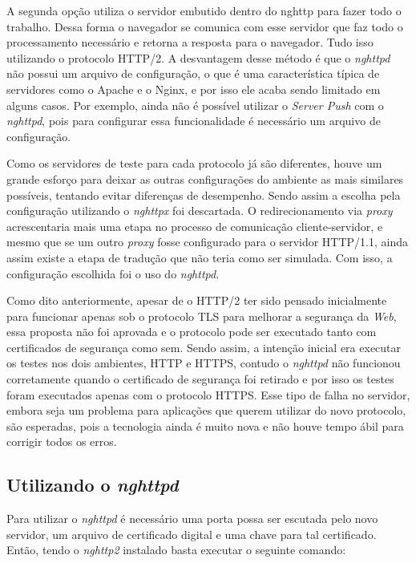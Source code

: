 A segunda opção utiliza o servidor embutido dentro do nghttp para fazer todo o trabalho. Dessa forma o navegador se comunica com esse servidor que faz todo o processamento necessário e retorna a resposta para o navegador. Tudo isso utilizando o protocolo HTTP/2. A desvantagem desse método é que o \textit{nghttpd} não possui um arquivo de configuração, o que é uma característica típica de servidores como o Apache e o Nginx, e por isso ele acaba sendo limitado em alguns casos. Por exemplo, ainda não é possível utilizar o \textit{Server Push} com o \textit{nghttpd}, pois para configurar essa funcionalidade é necessário um arquivo de configuração.

Como os servidores de teste para cada protocolo já são diferentes, houve um grande esforço para deixar as outras configurações do ambiente as mais similares possíveis, tentando evitar diferenças de desempenho. Sendo assim a escolha pela configuração utilizando o \textit{nghttpx} foi descartada. O redirecionamento via \textit{proxy} acrescentaria mais uma etapa no processo de comunicação cliente-servidor, e mesmo que se um outro \textit{proxy} fosse configurado para o servidor HTTP/1.1, ainda assim existe a etapa de tradução que não teria como ser simulada. Com isso, a configuração escolhida foi o uso do \textit{nghttpd}.

Como dito anteriormente, apesar de o HTTP/2 ter sido pensado inicialmente para funcionar apenas sob o protocolo TLS para melhorar a segurança da \textit{Web}, essa proposta não foi aprovada e o protocolo pode ser executado tanto com certificados de segurança como sem. Sendo assim, a intenção inicial era executar os testes nos dois ambientes, HTTP e HTTPS, contudo o \textit{nghttpd} não funcionou corretamente quando o certificado de segurança foi retirado e por isso os testes foram executados apenas com o protocolo HTTPS. Esse tipo de falha no servidor, embora seja um problema para aplicações que querem utilizar do novo protocolo, são esperadas, pois a tecnologia ainda é muito nova e não houve tempo ábil para corrigir todos os erros.

\subsection{Utilizando o \textit{nghttpd}}
\label{utilizandoonghttpd}

Para utilizar o \textit{nghttpd} é necessário uma porta possa ser escutada pelo novo servidor, um arquivo de certificado digital e uma chave para tal certificado. Então, tendo o \textit{nghttp2} instalado basta executar o seguinte comando:


